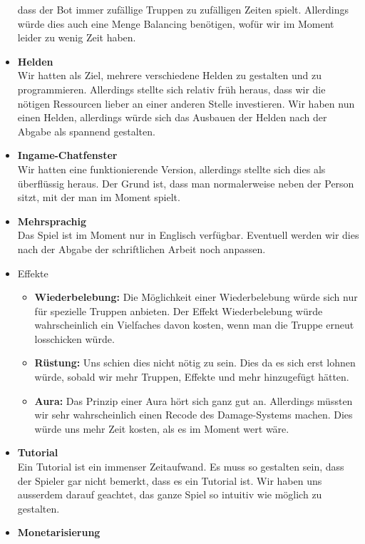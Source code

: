 \begin{itemize}
        dass der Bot immer zufällige Truppen zu zufälligen Zeiten spielt. Allerdings würde dies auch eine Menge Balancing benötigen, wofür wir im Moment leider zu wenig
        Zeit haben.
    \item \textbf{Helden} \\
        Wir hatten als Ziel, mehrere verschiedene Helden zu gestalten und zu programmieren. Allerdings stellte sich relativ früh heraus, dass wir die nötigen Ressourcen
        lieber an einer anderen Stelle investieren. Wir haben nun einen Helden, allerdings würde sich das Ausbauen der Helden nach der Abgabe als spannend gestalten.
    \item \textbf{Ingame-Chatfenster}\\
        Wir hatten eine funktionierende Version, allerdings stellte sich dies als überflüssig heraus. Der Grund ist, dass man normalerweise neben der Person sitzt,
        mit der man im Moment spielt.
    \item \textbf{Mehrsprachig} \\
        Das Spiel ist im Moment nur in Englisch verfügbar. Eventuell werden wir dies nach der Abgabe der schriftlichen Arbeit noch anpassen.
    \item Effekte
    \begin{itemize}
        \item \textbf{Wiederbelebung:}
            Die Möglichkeit einer Wiederbelebung würde sich nur für spezielle Truppen anbieten. Der Effekt Wiederbelebung würde wahrscheinlich ein Vielfaches davon kosten,
            wenn man die Truppe erneut losschicken würde. 
         \item \textbf{Rüstung:}
            Uns schien dies nicht nötig zu sein. Dies da es sich erst lohnen würde, sobald wir mehr Truppen, Effekte und mehr hinzugefügt hätten.
        \item \textbf{Aura:}
            Das Prinzip einer Aura hört sich ganz gut an. Allerdings müssten wir sehr wahrscheinlich einen Recode des Damage-Systems machen. Dies würde uns mehr Zeit kosten,
            als es im Moment wert wäre.
    \end{itemize}
    \item \textbf{Tutorial} \\
        Ein Tutorial ist ein immenser Zeitaufwand. Es muss so gestalten sein, dass der Spieler gar nicht bemerkt, dass es ein Tutorial ist. Wir haben uns ausserdem darauf 
        geachtet, das ganze Spiel so intuitiv wie möglich zu gestalten.
    \item \textbf{Monetarisierung} \\

\end{itemize}
